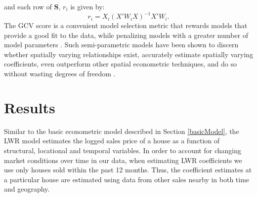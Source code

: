 \documentclass{article}\usepackage{graphicx, color}
\begin{document}
                   and each row of \textbf{S}, $r_i$ is given by:
                     \begin{equation*}
                   r_i=X_i(X'W_iX)^{-1}X'W_i.
                   \end{equation*}
The GCV score is a convenient model selection metric that rewards models that provide a good fit to the data, while penalizing models with a greater number of model parameters \citep{Loader1999, McMillen2010}. Such semi-parametric models have been shown to discern whether spatially varying relationships exist, accurately estimate spatially varying coefficients, even outperform other spatial econometric techniques, and do so without wasting degrees of freedom \citep{Paez2011, McMillen2010, McMillen2012}. 


\section{Results}
Similar to the basic econometric model described in Section \ref{basicModel}, the LWR model estimates the logged sales price of a house as a function of structural, locational and temporal variables. In order to account for changing market conditions over time in our data, when estimating LWR coefficients we use only houses sold within the past 12 months. Thus, the coefficient estimates at a particular house are estimated using data from other sales nearby in both time and geography.
\end{document}
